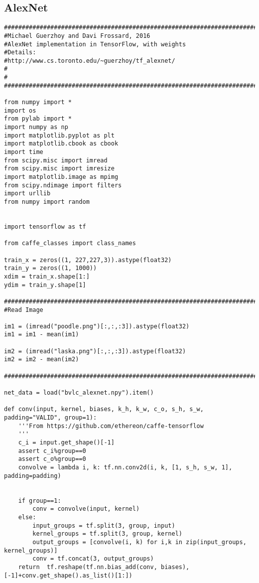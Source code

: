 \subsection*{AlexNet}
\begin{lstlisting}
################################################################################
#Michael Guerzhoy and Davi Frossard, 2016
#AlexNet implementation in TensorFlow, with weights
#Details: 
#http://www.cs.toronto.edu/~guerzhoy/tf_alexnet/
#
#
################################################################################

from numpy import *
import os
from pylab import *
import numpy as np
import matplotlib.pyplot as plt
import matplotlib.cbook as cbook
import time
from scipy.misc import imread
from scipy.misc import imresize
import matplotlib.image as mpimg
from scipy.ndimage import filters
import urllib
from numpy import random


import tensorflow as tf

from caffe_classes import class_names

train_x = zeros((1, 227,227,3)).astype(float32)
train_y = zeros((1, 1000))
xdim = train_x.shape[1:]
ydim = train_y.shape[1]

################################################################################
#Read Image

im1 = (imread("poodle.png")[:,:,:3]).astype(float32)
im1 = im1 - mean(im1)

im2 = (imread("laska.png")[:,:,:3]).astype(float32)
im2 = im2 - mean(im2)

################################################################################

net_data = load("bvlc_alexnet.npy").item()

def conv(input, kernel, biases, k_h, k_w, c_o, s_h, s_w,  padding="VALID", group=1):
    '''From https://github.com/ethereon/caffe-tensorflow
    '''
    c_i = input.get_shape()[-1]
    assert c_i%group==0
    assert c_o%group==0
    convolve = lambda i, k: tf.nn.conv2d(i, k, [1, s_h, s_w, 1], padding=padding)
    
    
    if group==1:
        conv = convolve(input, kernel)
    else:
        input_groups = tf.split(3, group, input)
        kernel_groups = tf.split(3, group, kernel)
        output_groups = [convolve(i, k) for i,k in zip(input_groups, kernel_groups)]
        conv = tf.concat(3, output_groups)
    return  tf.reshape(tf.nn.bias_add(conv, biases), [-1]+conv.get_shape().as_list()[1:])


\end{lstlisting}
